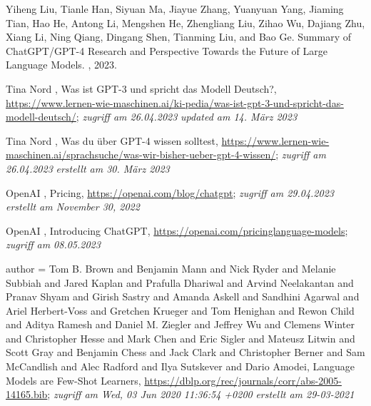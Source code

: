 \begin{thebibliography}{XXXX}

Yiheng Liu, Tianle Han, Siyuan Ma, Jiayue Zhang, Yuanyuan Yang, Jiaming Tian, Hao He, Antong Li, Mengshen He, Zhengliang Liu, Zihao Wu, Dajiang Zhu, Xiang Li, Ning Qiang, Dingang Shen, Tianming Liu, and Bao Ge.
\newblock Summary of ChatGPT/GPT-4 Research and Perspective Towards the Future of Large Language Models.
, 2023.

 Tina Nord , Was ist GPT-3 und spricht das Modell Deutsch?,
\url{https://www.lernen-wie-maschinen.ai/ki-pedia/was-ist-gpt-3-und-spricht-das-modell-deutsch/}; \textit{zugriff am 26.04.2023} \textit{updated am 14. März 2023}

 Tina Nord , Was du über GPT-4 wissen solltest,
\url{https://www.lernen-wie-maschinen.ai/sprachsuche/was-wir-bisher-ueber-gpt-4-wissen/}; \textit{zugriff am 26.04.2023} \textit{erstellt am  30. März 2023}


 OpenAI , Pricing,
\url{https://openai.com/blog/chatgpt}; \textit{zugriff am 29.04.2023} \textit{erstellt am  November 30, 2022}

 OpenAI , Introducing ChatGPT,
\url{https://openai.com/pricinglanguage-models}; \textit{zugriff am 08.05.2023} 

author  = {Tom B. Brown and
                  Benjamin Mann and
                  Nick Ryder and
                  Melanie Subbiah and
                  Jared Kaplan and
                  Prafulla Dhariwal and
                  Arvind Neelakantan and
                  Pranav Shyam and
                  Girish Sastry and
                  Amanda Askell and
                  Sandhini Agarwal and
                  Ariel Herbert{-}Voss and
                  Gretchen Krueger and
                  Tom Henighan and
                  Rewon Child and
                  Aditya Ramesh and
                  Daniel M. Ziegler and
                  Jeffrey Wu and
                  Clemens Winter and
                  Christopher Hesse and
                  Mark Chen and
                  Eric Sigler and
                  Mateusz Litwin and
                  Scott Gray and
                  Benjamin Chess and
                  Jack Clark and
                  Christopher Berner and
                  Sam McCandlish and
                  Alec Radford and
                  Ilya Sutskever and
                  Dario Amodei}, Language Models are Few-Shot Learners,
\url{https://dblp.org/rec/journals/corr/abs-2005-14165.bib}; \textit{zugriff am Wed, 03 Jun 2020 11:36:54 +0200} \textit{erstellt am 29-03-2021}



\end{thebibliography}
